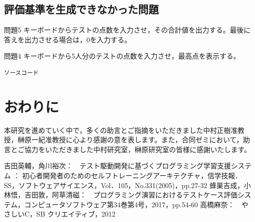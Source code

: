 \documentclass{tpu-sotu}
\begin{document}
\section{評価基準を生成できなかった問題}
\begin{itembox}[l]{問題5}
キーボードからテストの点数を入力させ，その合計値を出力する。最後に答えを出力させる場合は，0を入力する。
\end{itembox}



\begin{itembox}[l]{問題4}
キーボードから5人分のテストの点数を入力させ，最高点を表示する。
\end{itembox}






\begin{lstlisting}[xleftmargin=1cm]
   ソースコード
\end{lstlisting}
\chapter{おわりに}

\acknowledgements
本研究を進めていく中で，多くの助言とご指摘をいただきました中村正樹准教授，榊原一紀准教授に心より感謝の意を表します。また，合同ゼミにおいて，助言とご協力をいただきました中村研究室，榊原研究室の皆様に感謝いたします。
\begin{thebibliography}{2}
    吉田英輔，角川裕次：　テスト駆動開発に基づくプログラミング学習支援システム ： 初心者開発者のためのセルフトレーニングアーキテクチャ，信学技報．\\SS，ソフトウェアサイエンス，Vol．105，No.331(2005)，pp.27-32
    蜂巣吉成，小林悟，吉田敦，阿草清磁：　プログラミング演習におけるテストケース評価システム，コンピュータソフトウェア第34巻第4号，2017，pp.54-60
    高橋麻奈：　やさしいC，SB クリエイティブ，2012
\end{thebibliography}
\end{document}
